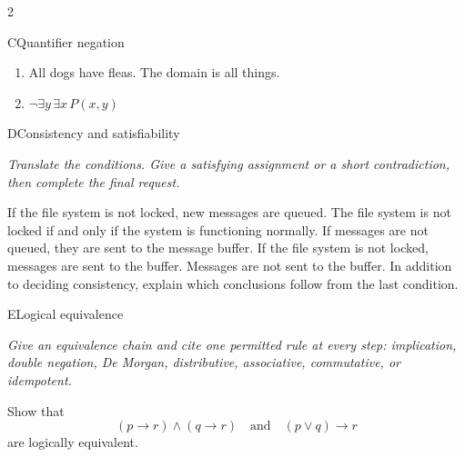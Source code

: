 \documentclass[9pt]{extarticle}
\begin{document}
\begin{multicols}{2}
\begin{CoreProblem}{C}{Quantifier negation}
\begin{enumerate}[label=(\alph*)]
  \item All dogs have fleas. The domain is all things.
  \item $\neg\exists y\,\exists x\,P(x,y)$
\end{enumerate}
\end{CoreProblem}
\columnbreak
\begin{CoreProblem}{D}{Consistency and satisfiability}
{\scriptsize\textit{Translate the conditions. Give a satisfying assignment or a short contradiction, then complete the final request.}\par}
If the file system is not locked, new messages are queued. The file system is
not locked if and only if the system is functioning normally. If messages are
not queued, they are sent to the message buffer. If the file system is not
locked, messages are sent to the buffer. Messages are not sent to the buffer.
In addition to deciding consistency, explain which conclusions follow from the
last condition.
\end{CoreProblem}
\begin{CoreProblem}{E}{Logical equivalence}
{\scriptsize\textit{Give an equivalence chain and cite one permitted rule at every step: implication, double negation, De Morgan, distributive, associative, commutative, or idempotent.}\par}
Show that
\[
  (p\to r)\land(q\to r)
  \quad\text{and}\quad
  (p\lor q)\to r
\]
are logically equivalent.
\end{CoreProblem}
\end{multicols}
\CoreWorkArea
\end{document}
